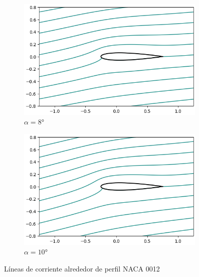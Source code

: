 \documentclass[letterpaper, openright, 12pt]{book}
\begin{document}
\begin{figure}[htbp!]
\begin{subfigure}[c]{0.48\textwidth}
            \includegraphics[keepaspectratio, width=0.99\textwidth]
                {./img/potential_flow_stream_8}
            \caption{$\alpha = 8\si{\degree}$}
            \label{fig:potential_flow_stream_8}
        \end{subfigure}
        \hfill
        \begin{subfigure}[c]{0.48\textwidth}
            \includegraphics[keepaspectratio, width=0.99\textwidth]
                {./img/potential_flow_stream_10}
            \caption{$\alpha = 10\si{\degree}$}
        \end{subfigure}
        \caption{Líneas de corriente alrededor de perfil NACA 0012}
        \label{fig:potential_flow_stream__1}
    \end{figure}
\end{document}
